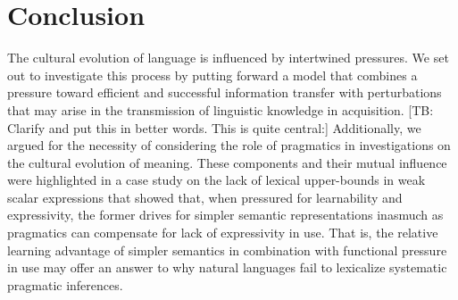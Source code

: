 \documentclass[a4paper]{article}
\newcommand{\tb}[1]{\textcolor[rgb]{.8,.33,.0}{[TB: #1]}}%
\begin{document}
\section{Conclusion}
The cultural evolution of language is influenced by intertwined pressures. We set out to investigate this process by putting forward a model that combines a pressure toward efficient and successful information transfer with perturbations that may arise in the transmission of linguistic knowledge in acquisition. \tb{Clarify and put this in better words. This is quite central:} Additionally, we argued for the necessity of considering the role of pragmatics in investigations on the cultural evolution of meaning. These components and their mutual influence were highlighted in a case study on the lack of lexical upper-bounds in weak scalar expressions that showed that, when pressured for learnability and expressivity, the former drives for simpler semantic representations inasmuch as pragmatics can compensate for lack of expressivity in use. That is, the relative learning advantage of simpler semantics in combination with  functional pressure in use may offer an answer to why natural languages fail to lexicalize systematic pragmatic inferences.




\end{document}

